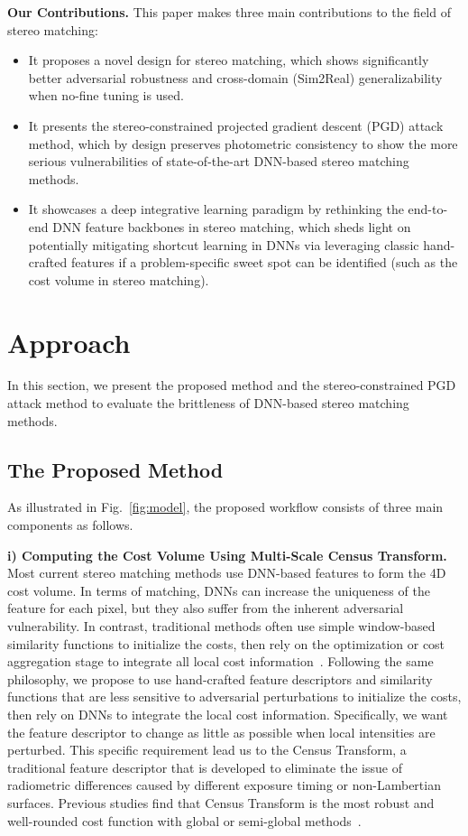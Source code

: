 \documentclass[10pt,twocolumn,letterpaper]{article}
\begin{document}
\textbf{Our Contributions.} This paper makes three main contributions to the field of stereo matching:  
\begin{itemize}
    \item It proposes a novel design for stereo matching, which shows significantly better adversarial robustness and cross-domain (Sim2Real) generalizability when no-fine tuning is used.
    \item  It presents the stereo-constrained projected gradient descent (PGD) attack method, which by design preserves photometric consistency to show the more serious vulnerabilities of state-of-the-art DNN-based stereo matching methods.
    \item  It showcases a deep integrative learning paradigm by rethinking the end-to-end DNN feature backbones in stereo matching, which sheds light on potentially mitigating shortcut learning in DNNs via leveraging classic hand-crafted features if a problem-specific sweet spot can be identified (such as the cost volume in stereo matching). 
\end{itemize}


\section{Approach}
In this section, we present the proposed method and the stereo-constrained PGD attack method to evaluate the brittleness of DNN-based stereo matching methods. 


\subsection{The Proposed Method}
As illustrated in Fig.~\ref{fig:model}, the proposed workflow consists of three main components as follows.

\textbf{i) Computing the Cost Volume Using Multi-Scale Census Transform.}
Most current stereo matching methods use DNN-based features to form the 4D cost volume. In terms of matching, DNNs can increase the uniqueness of the feature for each pixel, but they also suffer from the inherent adversarial vulnerability. In contrast, traditional methods often use simple window-based similarity functions to initialize the costs, then rely on the optimization or cost aggregation stage to integrate all local cost information~\cite{szeliski2010computer}. Following the same philosophy, we propose to use hand-crafted feature descriptors and similarity functions that are less sensitive to adversarial perturbations to initialize the costs, then rely on DNNs to integrate the local cost information. Specifically, we want the feature descriptor to change as little as possible when local intensities are perturbed. This specific requirement lead us to the Census Transform, a traditional feature descriptor that is developed to eliminate the issue of radiometric differences caused by different exposure timing or non-Lambertian surfaces. Previous studies find that Census Transform is the most robust and well-rounded cost function with global or semi-global methods~\cite{hirschmuller2008evaluation,bleyer2010does}.
\end{document}
